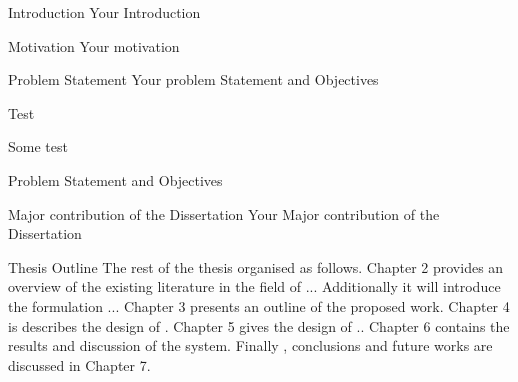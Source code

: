 \begin{chapter}{Introduction}
    \thispagestyle{empty}
    Your Introduction
    \begin{section}{Motivation}
        Your motivation
    \end{section}

    \begin{section}{Problem Statement}
        Your problem Statement and Objectives
        \begin{subsection}{Test}
            \lipsum[1]
            \begin{subsubsection}{Some test}
                    \lipsum[5]
                    \lipsum[3]
            \end{subsubsection}
        \end{subsection}
    \end{section}{Problem Statement and Objectives}

    \begin{section}{Major contribution of the Dissertation}
        Your Major contribution of the Dissertation
    \end{section}
    \begin{section}{Thesis Outline}
    The rest of the thesis organised as follows. Chapter 2 provides an overview of the existing literature in the field of ...  Additionally it will introduce the formulation ... Chapter 3 presents an outline of the proposed work. Chapter 4 is describes the design of . Chapter 5  gives the design of .. Chapter 6 contains the results and discussion of the system.
    Finally , conclusions and future works are discussed in Chapter 7.
    
    \lipsum[10]
    \lipsum[6]
        
    \end{section}
\end{chapter}